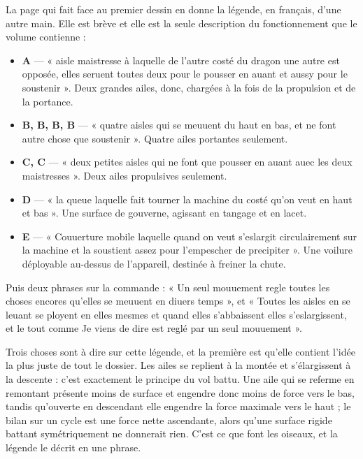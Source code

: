 \documentclass[11pt,a4paper]{article}
\begin{document}
La page qui fait face au premier dessin en donne la légende, en français, d'une
autre main. Elle est brève et elle est la seule description du fonctionnement que
le volume contienne :

\begin{itemize}
  \item \textbf{A} — « aisle maistresse à laquelle de l'autre costé du dragon
    une autre est opposée, elles seruent toutes deux pour le pousser en auant et
    aussy pour le soustenir ». Deux grandes ailes, donc, chargées à la fois de
    la propulsion et de la portance.
  \item \textbf{B, B, B, B} — « quatre aisles qui se meuuent du haut en bas, et
    ne font autre chose que soustenir ». Quatre ailes portantes seulement.
  \item \textbf{C, C} — « deux petites aisles qui ne font que pousser en auant
    auec les deux maistresses ». Deux ailes propulsives seulement.
  \item \textbf{D} — « la queue laquelle fait tourner la machine du costé qu'on
    veut en haut et bas ». Une surface de gouverne, agissant en tangage et en
    lacet.
  \item \textbf{E} — « Couuerture mobile laquelle quand on veut s'eslargit
    circulairement sur la machine et la soustient assez pour l'empescher de
    precipiter ». Une voilure déployable au-dessus de l'appareil, destinée à
    freiner la chute.
\end{itemize}

Puis deux phrases sur la commande : « Un seul mouuement regle toutes les choses
encores qu'elles se meuuent en diuers temps », et « Toutes les aisles en se
leuant se ployent en elles mesmes et quand elles s'abbaissent elles
s'eslargissent, et le tout comme Je viens de dire est reglé par un seul
mouuement ».

Trois choses sont à dire sur cette légende, et la première est qu'elle contient
l'idée la plus juste de tout le dossier. Les ailes se replient à la montée et
s'élargissent à la descente : c'est exactement le principe du vol battu. Une
aile qui se referme en remontant présente moins de surface et engendre donc
moins de force vers le bas, tandis qu'ouverte en descendant elle engendre la
force maximale vers le haut ; le bilan sur un cycle est une force nette
ascendante, alors qu'une surface rigide battant symétriquement ne donnerait rien.
C'est ce que font les oiseaux, et la légende le décrit en une phrase.
\end{document}
